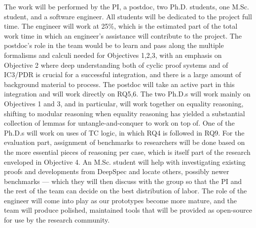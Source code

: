 \bigskip
The work will be performed by the PI, a postdoc, two Ph.D. students, one M.Sc. student, and a software engineer.
All students will be dedicated to the project full time.
The engineer will work at 25\%, which is the estimated part of the total work time in which an engineer's assistance will contribute to the project.
The postdoc's role in the team would be to learn and pass along the multiple formalisms and calculi needed for Objectives 1,2,3, with an emphasis on Objective 2 where deep understanding both of cyclic proof systems and of IC3/PDR is crucial for a successful integration,
and there is a large amount of background material to process.
The postdoc will take an active part in this integration and will work directly on RQ5,6.
The two Ph.D.s will work mainly on Objectives 1 and 3, and in particular, will work together on equality reasoning, shifting to modular reasoning when equality reasoning has yielded a substantial collection of lemmas for untangle-and-conquer to work on top of.
One of the Ph.D.s will work on uses of TC logic, in which RQ4 is followed in RQ9.
For the evaluation part, assignment of benchmarks to researchers will be done based on the more essential pieces of reasoning per case,
which is itself part of the research enveloped in Objective 4.
An M.Sc. student will help with investigating existing proofs and developments from DeepSpec and locate others, possibly newer benchmarks --- which they will then discuss with the group so that the PI and the rest of the team can decide on the best distribution of labor.
The role of the engineer will come into play as our prototypes become more mature, and the team will produce polished, maintained tools that will be provided as open-source for use by the research community.